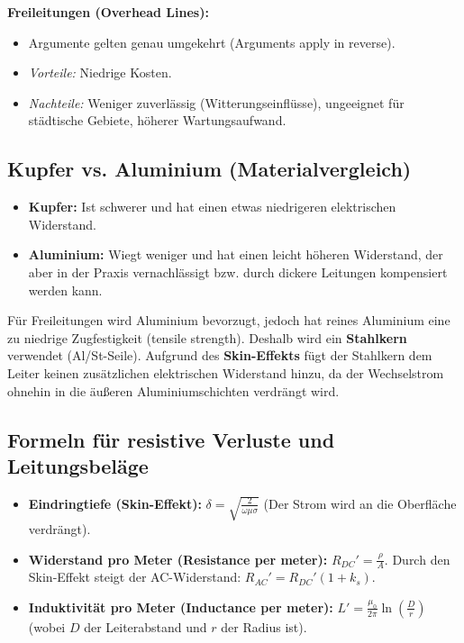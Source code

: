 \documentclass[11pt, a4paper]{article}
\begin{document}
\textbf{Freileitungen (Overhead Lines):}
\begin{itemize}
    \item Argumente gelten genau umgekehrt (Arguments apply in reverse).
    \item \textit{Vorteile:} Niedrige Kosten.
    \item \textit{Nachteile:} Weniger zuverlässig (Witterungseinflüsse), ungeeignet für städtische Gebiete, höherer Wartungsaufwand.
\end{itemize}

\subsection{Kupfer vs. Aluminium (Materialvergleich)}
\begin{itemize}
    \item \textbf{Kupfer:} Ist schwerer und hat einen etwas niedrigeren elektrischen Widerstand.
    \item \textbf{Aluminium:} Wiegt weniger und hat einen leicht höheren Widerstand, der aber in der Praxis vernachlässigt bzw. durch dickere Leitungen kompensiert werden kann.
\end{itemize}
Für Freileitungen wird Aluminium bevorzugt, jedoch hat reines Aluminium eine zu niedrige Zugfestigkeit (tensile strength). Deshalb wird ein \textbf{Stahlkern} verwendet (Al/St-Seile). Aufgrund des \textbf{Skin-Effekts} fügt der Stahlkern dem Leiter keinen zusätzlichen elektrischen Widerstand hinzu, da der Wechselstrom ohnehin in die äußeren Aluminiumschichten verdrängt wird.

\subsection{Formeln für resistive Verluste und Leitungsbeläge}
\begin{itemize}
    \item \textbf{Eindringtiefe (Skin-Effekt):} $\delta = \sqrt{\frac{2}{\omega \mu \sigma}}$ (Der Strom wird an die Oberfläche verdrängt).
    \item \textbf{Widerstand pro Meter (Resistance per meter):} $R_{DC}' = \frac{\rho}{A}$. Durch den Skin-Effekt steigt der AC-Widerstand: $R_{AC}' = R_{DC}'(1 + k_s)$.
    \item \textbf{Induktivität pro Meter (Inductance per meter):} $L' = \frac{\mu_0}{2\pi} \ln\left(\frac{D}{r}\right)$ (wobei $D$ der Leiterabstand und $r$ der Radius ist).
\end{itemize}
\end{document}
